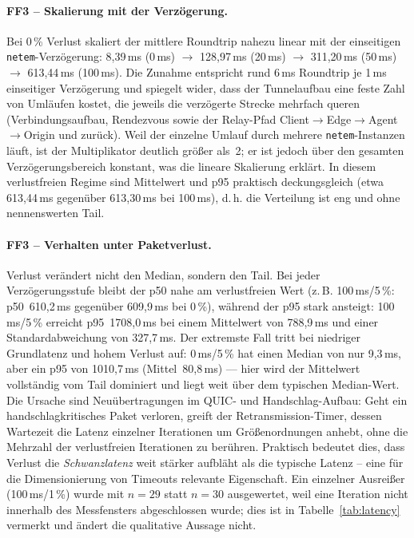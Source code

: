 \paragraph{FF3 -- Skalierung mit der Verzögerung.} Bei 0\,\% Verlust skaliert
der mittlere Roundtrip nahezu linear mit der einseitigen
\texttt{netem}-Verzögerung: 8{,}39\,ms (0\,ms) $\rightarrow$ 128{,}97\,ms
(20\,ms) $\rightarrow$ 311{,}20\,ms (50\,ms) $\rightarrow$ 613{,}44\,ms
(100\,ms). Die Zunahme entspricht rund 6\,ms Roundtrip je 1\,ms einseitiger
Verzögerung und spiegelt wider, dass der Tunnelaufbau eine feste Zahl von
Umläufen kostet, die jeweils die verzögerte Strecke mehrfach queren
(Verbindungsaufbau, Rendezvous sowie der Relay-Pfad Client$\rightarrow$Edge$\rightarrow$Agent$\rightarrow$Origin und zurück).
Weil der einzelne Umlauf durch mehrere \texttt{netem}-Instanzen läuft, ist der
Multiplikator deutlich größer als~2; er ist jedoch über den gesamten
Verzögerungsbereich konstant, was die lineare Skalierung erklärt. In diesem
verlustfreien Regime sind Mittelwert und p95 praktisch deckungsgleich (etwa
613{,}44\,ms gegenüber 613{,}30\,ms bei 100\,ms), d.\,h. die Verteilung ist eng
und ohne nennenswerten Tail.

\paragraph{FF3 -- Verhalten unter Paketverlust.} Verlust verändert nicht den
Median, sondern den Tail. Bei jeder Verzögerungsstufe bleibt der p50 nahe am
verlustfreien Wert (z.\,B. 100\,ms/5\,\%: p50~610{,}2\,ms gegenüber
609{,}9\,ms bei 0\,\%), während der p95 stark ansteigt: 100\,ms/5\,\%
erreicht p95~1708{,}0\,ms bei einem Mittelwert von
788{,}9\,ms und einer Standardabweichung von 327{,}7\,ms. Der extremste Fall
tritt bei niedriger Grundlatenz und hohem Verlust auf: 0\,ms/5\,\% hat einen
Median von nur 9{,}3\,ms, aber ein p95 von 1010{,}7\,ms
(Mittel~80{,}8\,ms) --- hier wird der Mittelwert vollständig vom Tail dominiert
und liegt weit über dem typischen Median-Wert. Die Ursache
sind Neuübertragungen im QUIC- und Handschlag-Aufbau: Geht ein
handschlagkritisches Paket verloren, greift der Retransmission-Timer, dessen
Wartezeit die Latenz einzelner Iterationen um Größenordnungen anhebt, ohne die
Mehrzahl der verlustfreien Iterationen zu berühren. Praktisch bedeutet dies,
dass Verlust die \emph{Schwanzlatenz} weit stärker aufbläht als die typische
Latenz -- eine für die Dimensionierung von Timeouts relevante Eigenschaft.
Ein einzelner Ausreißer (100\,ms/1\,\%) wurde mit $n=29$ statt $n=30$
ausgewertet, weil eine Iteration nicht innerhalb des Messfensters
abgeschlossen wurde; dies ist in Tabelle~\ref{tab:latency} vermerkt und ändert
die qualitative Aussage nicht.

